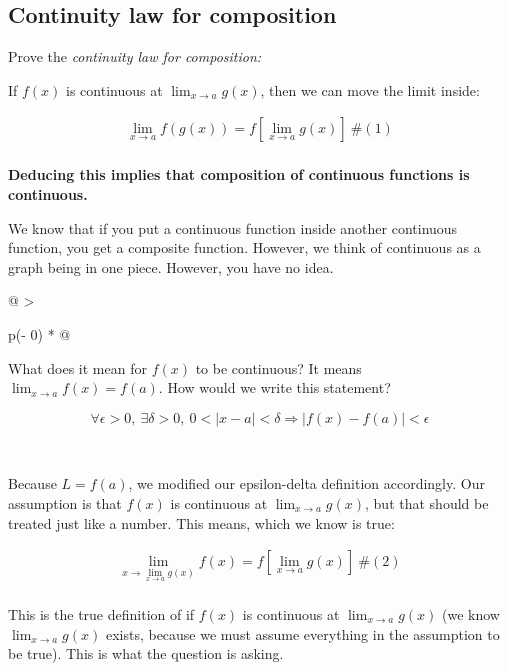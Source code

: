 \documentclass[
]{article}
\begin{document}
\subsection{Continuity law for
composition}

Prove the \emph{continuity law for composition:}

If $f(x)$ is continuous at $\lim_{x \rightarrow a}{g(x)}$, then we
can move the limit inside:

$$\begin{matrix}
\lim_{x \rightarrow a}{f\left( g(x) \right) = f\left\lbrack \lim_{x \rightarrow a}{g(x)} \right\rbrack}\ \#(1) \\
\end{matrix}$$

\textbf{Deducing this implies that composition of continuous functions
is continuous.}

We know that if you put a continuous function inside another continuous
function, you get a composite function. However, we think of continuous
as a graph being in one piece. However, you have no idea.

\begin{longtable}[]{@{}
  >{\raggedright\arraybackslash}p{(\columnwidth - 0\tabcolsep) * }@{}}
\toprule
\begin{minipage}[b]{\linewidth}\raggedright
What does it mean for $f(x)$ to be continuous? It means
$\lim_{x \rightarrow a}{f(x)} = f(a)$. How would we write this
statement?

$$\forall\epsilon > 0,\ \exists\delta > 0,\ 0 < |x - a| < \delta \Rightarrow |f(x) - f(a)| < \epsilon$$
\end{minipage} \\
\midrule
\endhead
\bottomrule
\end{longtable}

Because $L = f(a)$, we modified our epsilon-delta definition
accordingly. Our assumption is that $f(x)$ is continuous at
$\lim_{x \rightarrow a}{g(x)}$, but that should be treated just like a
number. This means, which we know is true:

$$\begin{matrix}
\lim_{x \rightarrow \lim_{x \rightarrow a}{g(x)}}{f(x)} = f\left\lbrack \lim_{x \rightarrow a}{g(x)} \right\rbrack\ \#(2) \\
\end{matrix}$$

This is the true definition of if $f(x)$ is continuous at
$\lim_{x \rightarrow a}{g(x)}$ (we know
$\lim_{x \rightarrow a}{g(x)}$ exists, because we must assume
everything in the assumption to be true). This is what the question is
asking.
\end{document}
